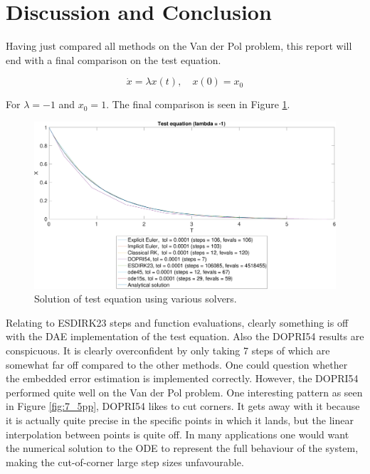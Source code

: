 \section{Discussion and Conclusion}
Having just compared all methods on the Van der Pol problem, this report will end with a final comparison on the test equation.

\begin{equation}
    \dot{x} = \lambda x(t), \quad x(0) = x_0
\end{equation}

For $\lambda = -1$ and $x_0 = 1$. The final comparison is seen in Figure \ref{fig:final}.

\begin{figure}[H]
    \centering
    \includegraphics[width=\textwidth]{plots/8a.pdf}
    \caption{Solution of test equation using various solvers.}
    \label{fig:final}
\end{figure}

Relating to ESDIRK23 steps and function evaluations, clearly something is off with the DAE implementation of the test equation. Also the DOPRI54 results are conspicuous. It is clearly overconfident by only taking 7 steps of which are somewhat far off compared to the other methods. One could question whether the embedded error estimation is implemented correctly. However, the DOPRI54 performed quite well on the Van der Pol problem. One interesting pattern as seen in Figure \ref{fig:7_5pp}, DOPRI54 likes to cut corners. It gets away with it because it is actually quite precise in the specific points in which it lands, but the linear interpolation between points is quite off. In many applications one would want the numerical solution to the ODE to represent the full behaviour of the system, making the cut-of-corner large step sizes unfavourable.

